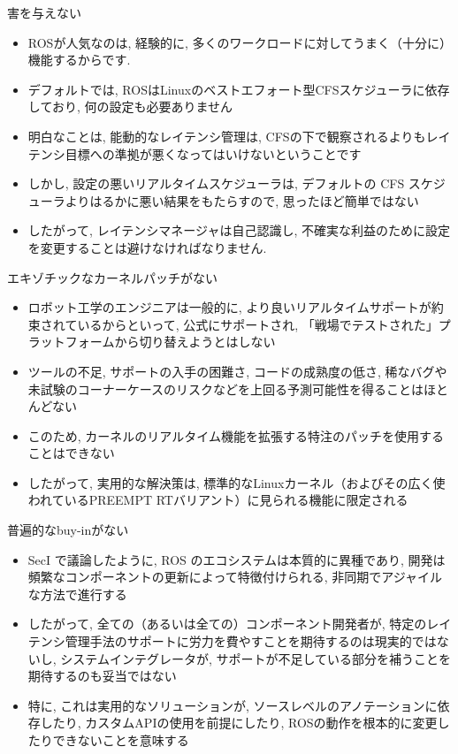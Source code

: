 \begin{frame}{害を与えない}
    \begin{itemize}
        \item ROSが人気なのは, 経験的に, 多くのワークロードに対してうまく（十分に）機能するからです.
        \item デフォルトでは, ROSはLinuxのベストエフォート型CFSスケジューラに依存しており, 何の設定も必要ありません
        \item 明白なことは, 能動的なレイテンシ管理は, CFSの下で観察されるよりもレイテンシ目標への準拠が悪くなってはいけないということです
        \item しかし, 設定の悪いリアルタイムスケジューラは, デフォルトの CFS スケジューラよりはるかに悪い結果をもたらすので, 思ったほど簡単ではない
        \item したがって, レイテンシマネージャは自己認識し, 不確実な利益のために設定を変更することは避けなければなりません.
    \end{itemize}
\end{frame}

\begin{frame}{エキゾチックなカーネルパッチがない}
    \begin{itemize}
        \item ロボット工学のエンジニアは一般的に, より良いリアルタイムサポートが約束されているからといって, 公式にサポートされ, 「戦場でテストされた」プラットフォームから切り替えようとはしない
        \item ツールの不足, サポートの入手の困難さ, コードの成熟度の低さ, 稀なバグや未試験のコーナーケースのリスクなどを上回る予測可能性を得ることはほとんどない
        \item このため, カーネルのリアルタイム機能を拡張する特注のパッチを使用することはできない
        \item したがって, 実用的な解決策は, 標準的なLinuxカーネル（およびその広く使われているPREEMPT RTバリアント）に見られる機能に限定される
    \end{itemize}
\end{frame}

\begin{frame}{普遍的なbuy-inがない}
    \begin{itemize}
        \item SecI で議論したように, ROS のエコシステムは本質的に異種であり, 開発は頻繁なコンポーネントの更新によって特徴付けられる, 非同期でアジャイルな方法で進行する
        \item したがって, 全ての（あるいは全ての）コンポーネント開発者が, 特定のレイテンシ管理手法のサポートに労力を費やすことを期待するのは現実的ではないし, システムインテグレータが, サポートが不足している部分を補うことを期待するのも妥当ではない
        \item 特に, これは実用的なソリューションが, ソースレベルのアノテーションに依存したり, カスタムAPIの使用を前提にしたり, ROSの動作を根本的に変更したりできないことを意味する
    \end{itemize}
\end{frame}

